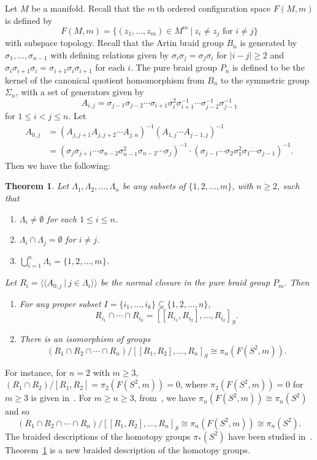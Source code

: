\documentclass[10pt]{amsart}
\newtheorem{thm}{Theorem}[section]
\let\la=\langle
\let\ra=\rangle
\numberwithin{equation}{section}
\begin{document}
Let $M$ be a manifold. Recall that the $m\,$th ordered configuration space $F(M,m)$ is defined by
$$
F(M,m)=\{(z_1,\ldots,z_m)\in M^m\ | \ z_i\not=z_j\textrm{ for } i\not=j\}
$$
with subspace topology. Recall that the Artin braid group $B_n$ is generated by $\sigma_1,\ldots,\sigma_{n-1}$ with defining relations given by $\sigma_i\sigma_j=\sigma_j\sigma_i$ for $|i-j|\geq 2$ and $\sigma_i\sigma_{i+1}\sigma_i=\sigma_{i+1}\sigma_i\sigma_{i+1}$ for each $i$. The pure braid group $P_n$ is defined to be the kernel of the canonical quotient homomorphism from $B_n$ to the symmetric group $\Sigma_n$, with a set of generators given by
$$
A_{i,j}=\sigma_{j-1}\sigma_{j-2}\cdots \sigma_{i+1}\sigma_i^2\sigma_{i+1}^{-1}\cdots\sigma_{j-2}^{-1}\sigma_{j-1}^{-1}
$$
for $1\leq i<j\leq n$. Let
\begin{align*}
A_{0,j}  &  =(A_{j,j+1}A_{j,j+2}\cdots A_{j,n})^{-1}(A_{1,j}\cdots
A_{j-1,j})^{-1}\\
&  =(\sigma_{j}\sigma_{j+1}\cdots\sigma_{n-2}\sigma_{n-1}^{2}\sigma
_{n-2}\cdots\sigma_{j})^{-1}\cdot(\sigma_{j-1}\cdots\sigma_{2}\sigma_{1}
^{2}\sigma_{1}\cdots\sigma_{j-1})^{-1}.
\end{align*}
Then we have the following:
\begin{thm}\label{theorem1.5}
Let $\Lambda_1,\Lambda_2,\ldots,\Lambda_n$ be any subsets of $\{1,2,\ldots,m\}$, with $n\geq 2$, such that
\begin{enumerate}
\item[(i)] $\Lambda_i\not=\emptyset$ for each $1\leq i\leq n$.
\item[(ii)] $\Lambda_i\cap \Lambda_j=\emptyset$ for $i\not=j$.
\item[(iii)] $\bigcup_{i=1}^n \Lambda_i=\{1,2,\ldots,m\}$.
\end{enumerate}
Let $R_i=\la\la A_{0,j} \ | \ j\in \Lambda_i\ra\ra$ be the normal closure in the pure braid group $P_m$. Then
\begin{enumerate}
\item For any proper subset $I=\{i_1,\ldots,i_k\}\subsetneq \{1,2,\ldots,n\}$,
$$
R_{i_1}\cap\cdots\cap R_{i_k}=[[R_{i_1}, R_{i_2}],\ldots,R_{i_k}]_S.
$$
\item There is an isomorphism of groups
$$
(R_1\cap R_2\cap\cdots\cap R_n)/[[R_1,R_2],\ldots,R_n]_S\cong \pi_n(F(S^2,m)).
$$
\end{enumerate}
\end{thm}

For instance, for $n=2$ with $m\geq 3$, $(R_1\cap R_2)/[R_1,R_2]=\pi_2(F(S^2,m))=0$, where $\pi_2(F(S^2,m))=0$ for $m\geq 3$ is given in~\cite[p. 244]{FB}. For $m\geq n\geq 3$, from~\cite[Theorem 1]{Fadell}, we have $\pi_n(F(S^2,m))\cong \pi_n(S^2)$ and so
$$
(R_1\cap R_2\cap\cdots\cap R_n)/[[R_1,R_2],\ldots,R_n]_S\cong \pi_n(F(S^2,m))\cong \pi_n(S^2).
$$
The braided descriptions of the homotopy groups $\pi_*(S^2)$ have
been studied in~\cite{BCWW,BMVW, CW1,CW2,LW, Wu2}.
Theorem~\ref{theorem1.5} is a new braided description of the
homotopy groups.
\end{document}
